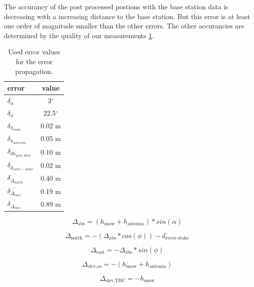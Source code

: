 The accurancy of the post processed postions with the base station data is decreasing with a increasing distance to the base station. 
But this error is at least one order of magnitude smaller than the other errors. 
The other accurancies are determined by the quality of our measurements \ref{GPS:tab:errors}.

\begin{table}[h]
	\caption{Used error values for the error propagation.}
	\centering
	\begin{tabular}{lc}
	\toprule
        error &  value \\
	\midrule
    $ \delta_{\alpha} $ &  3$^{\circ}$ \\
    $ \delta_{\phi} $ &  22.5$^{\circ}$ \\
    $ \delta_{h_{snow}}$ &  0.02 m \\
    $ \delta_{h_{antenna}} $ &  0.05 m \\
    $ \delta_{dh_{year,2018}} $ &  0.10 m \\
    $ \delta_{d_{rover-stake}} $ &  0.02 m \\
    $ \overline{\delta_{\Delta_{north}}} $ & 0.40 m \\
    $ \overline{\delta_{\Delta_{east}}} $ & 0.19 m \\
    $ \overline{\delta_{\Delta_{elev}}} $ & 0.89 m \\
    \bottomrule
\end{tabular}
	\label{GPS:tab:errors}
\end{table} 


\begin{equation}
	\Delta_{\text{abs}} = (h_{\text{snow}} + h_{\text{antenna}}) * sin(\alpha)
\end{equation}

\begin{equation}
	\Delta_{\text{north}} = - (\Delta_{\text{abs}} * cos(\phi)) - d_{\text{rover-stake}}
\end{equation}

\begin{equation}
	\Delta_{\text{east}} = - \Delta_{\text{abs}} * sin(\phi)
\end{equation}

\begin{equation}
	\Delta_{\text{elev,os}} = - (h_{\text{snow}} + h_{\text{antenna}}) 
\end{equation}

\begin{equation}
	\Delta_{\text{elev,TBC}} = - h_{\text{snow}} 
\end{equation}

